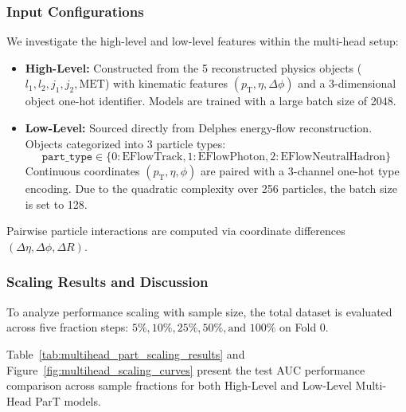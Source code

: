 \documentclass[12pt]{article}
\begin{document}
        \subsubsection{Input Configurations}%
        \label{subs:input_configurations}
            
			We investigate the high-level and low-level features within the multi-head setup:
			\begin{itemize}
				\item \textbf{High-Level:} Constructed from the 5 reconstructed physics objects ($l_1, l_2, j_1, j_2, \mathrm{MET}$) with kinematic features $(p_{\mathrm{T}}, \eta, \Delta\phi)$ and a 3-dimensional object one-hot identifier. Models are trained with a large batch size of 2048.
				\item \textbf{Low-Level:} Sourced directly from Delphes energy-flow reconstruction. Objects categorized into 3 particle types:
				\begin{equation*}
					\texttt{part\_type} \in \{0: \text{EFlowTrack}, 1: \text{EFlowPhoton}, 2: \text{EFlowNeutralHadron}\}
				\end{equation*}
				Continuous coordinates $(p_{\mathrm{T}}, \eta, \phi)$ are paired with a 3-channel one-hot type encoding. Due to the quadratic complexity over 256 particles, the batch size is set to 128.
			\end{itemize}
            Pairwise particle interactions are computed via coordinate differences $(\Delta\eta, \Delta\phi, \Delta R)$. 


		\subsubsection{Scaling Results and Discussion}%
		\label{subs:multihead_scaling_results_and_discussion}

			To analyze performance scaling with sample size, the total dataset is evaluated across five fraction steps: $5\%, 10\%, 25\%, 50\%, \text{and } 100\%$ on Fold 0.

			Table~\ref{tab:multihead_part_scaling_results} and Figure~\ref{fig:multihead_scaling_curves} present the test AUC performance comparison across sample fractions for both High-Level and Low-Level Multi-Head ParT models.
\end{document}
